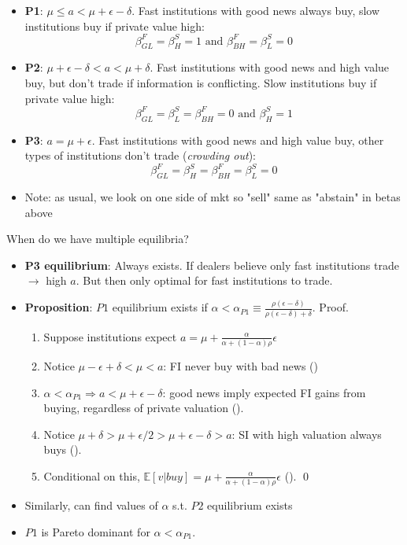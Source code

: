 \documentclass[english,10pt
,aspectratio=169
]{beamer}
\begin{document}
\begin{frame}{}
	\begin{itemize}
		\item \textbf{P1}: $\mu \leq a < \mu + \epsilon-\delta$. Fast institutions with good news always buy, slow institutions buy if private value high: 
		\[
		\beta^{F}_{GL}=\beta^{S}_{H}=1 \text{ and }\beta^{F}_{BH}=\beta^S_L=0
		\]
		\item \textbf{P2}: $\mu+\epsilon-\delta<a<\mu+\delta$. Fast institutions with good news and high value buy, but don't trade if information is conflicting. Slow institutions buy if private value high: 
		\[
		\beta^{F}_{GL}=\beta^S_L=\beta^{F}_{BH}=0 \text{ and }\beta^{S}_{H}=1
		\]
		\item \textbf{P3}: $a=\mu+\epsilon$. Fast institutions with good news and high value buy, other types of institutions don't trade (\textit{crowding out}):
		\[
		\beta^{F}_{GL}=\beta^{S}_{H}=\beta^{F}_{BH}=\beta^S_L=0
		\]
		\item Note: as usual, we look on one side of mkt so "sell" same as "abstain" in betas above
	\end{itemize}
\end{frame}


\begin{frame}{When do we have multiple equilibria?}
	\begin{itemize}
		\item \textbf{P3 equilibrium}: Always exists. If dealers believe only fast institutions trade $\rightarrow$  high $a$. But then only optimal for fast institutions to trade.
		\item \textbf{Proposition}: $P1$ equilibrium exists if $\alpha<\alpha_{P1} \equiv \frac{\rho(\epsilon-\delta)}{\rho(\epsilon-\delta)+\delta}$. Proof. 
		\begin{enumerate}
			\item Suppose institutions expect $a=\mu + \frac{\alpha}{\alpha+(1-\alpha)\rho} \epsilon$ 
			\item Notice $\mu-\epsilon+\delta<\mu<a$: FI never buy with bad news ()
			\item $\alpha<\alpha_{P1} \Rightarrow a<\mu+\epsilon-\delta$: good news imply expected FI gains from buying, regardless of private valuation
			().
			\item Notice $\mu+\delta>\mu+\epsilon/2>\mu+\epsilon-\delta >a$: SI with high valuation always buys ().
			\item Conditional on this, $\mathbb{E}[v|buy]=\mu + \frac{\alpha}{\alpha+(1-\alpha)\rho} \epsilon$ (). \qed
		\end{enumerate}
		\item Similarly, can find values of $\alpha$ s.t. $P2$ equilibrium exists
		\item $P1$ is Pareto dominant for $\alpha<\alpha_{P1}$. 
	\end{itemize}
\end{frame}
\end{document}
